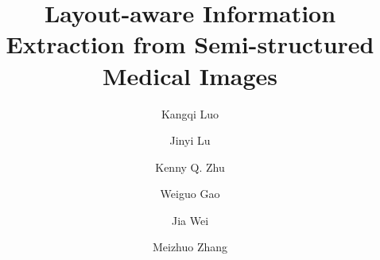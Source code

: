 \documentclass[final,3p,times,twocolumn]{elsarticle}
\begin{document}
\begin{frontmatter}



\title{Layout-aware Information Extraction from Semi-structured Medical Images}


\author[sjtu]{Kangqi Luo}
\author[sjtu]{Jinyi Lu}
\author[sjtu]{Kenny Q. Zhu}

\author[az]{Weiguo Gao}
\author[az]{Jia Wei}
\author[az]{Meizhuo Zhang}

\address[sjtu]{Shanghai Jiao Tong University, 800 Dongchuan Road, Shanghai 200240, P.R. China}
\address[az]{AstraZeneca China, 199 Liangjing Road, Shanghai 201203, P.R. China}



\end{frontmatter}
\end{document}
